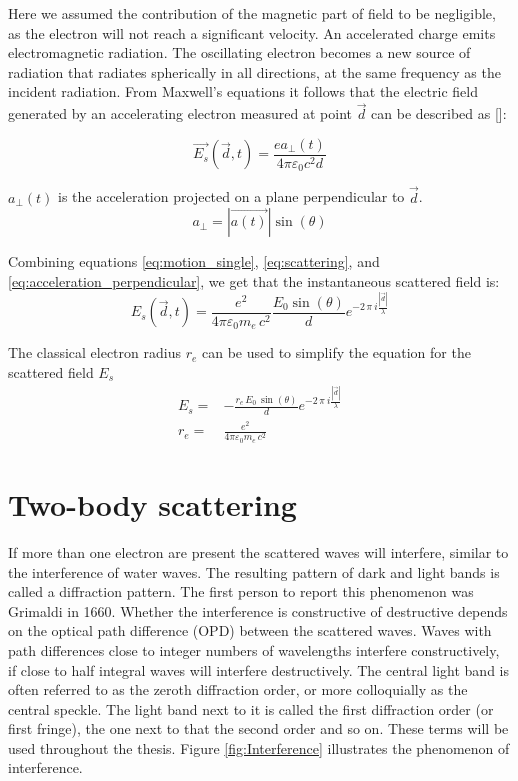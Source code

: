 Here we assumed the contribution of the magnetic part of field to be negligible, as the electron will not reach a significant velocity.
An accelerated charge emits electromagnetic radiation. The oscillating electron becomes a new source of radiation that radiates spherically in all directions, at the same frequency as the incident radiation. From Maxwell's equations it follows that the electric field generated by an accelerating electron measured at point $\vec{d}$  can be described as []:

\begin{equation}\label{eq:scattering}
\vec{E_s}(\vec{d},t) = \frac{e a_\perp(t)}{4 \pi \varepsilon_0c^2d}
\end{equation}

$a_{\perp}(t)$ is the acceleration projected on a plane perpendicular to $\vec{d}$. 
\begin{equation}\label{eq:acceleration_perpendicular}
a_\perp = |\vec{a(t)}|\sin(\theta)
\end{equation}

Combining equations \ref{eq:motion_single}, \ref{eq:scattering}, and \ref{eq:acceleration_perpendicular}, we get that the instantaneous scattered field is:
\begin{equation}
E_s(\vec{d},t) = \frac{{e}^2}{4 \pi \varepsilon_0 m_e\,c^2} \frac{E_0 \sin(\theta)}{d} e^{-2\,\pi\ i \frac{|\vec{d}|}{\lambda}}
\end{equation}

The classical electron radius $r_e$ can be used to simplify the equation for the scattered field $E_s$
\begin{align*}
E_s=& - \frac{r_e\,E_0\,\sin(\theta)}{d} e^{-2\,\pi\ i \frac{|\vec{d}|}{\lambda}}\\
r_e =& \frac{e^2}{4 \pi \varepsilon_0 m_e\,c^2}    
\end{align*}


\section{Two-body scattering}
If more than one electron are present the scattered waves will interfere, similar to the interference of water waves. The resulting pattern of dark and light bands is called a diffraction pattern. The first person to report this phenomenon was Grimaldi in 1660. Whether the interference is constructive of destructive depends on the optical path difference (OPD) between the scattered waves. Waves with path differences close to integer numbers of wavelengths interfere constructively, if close to half integral waves will interfere destructively. The central light band is often referred to as the zeroth diffraction order, or more colloquially as the central speckle. The light band next to it is called the first diffraction order (or first fringe), the one next to that the second order and so on. These terms will be used throughout the thesis. Figure \ref{fig:Interference} illustrates the phenomenon of interference.

